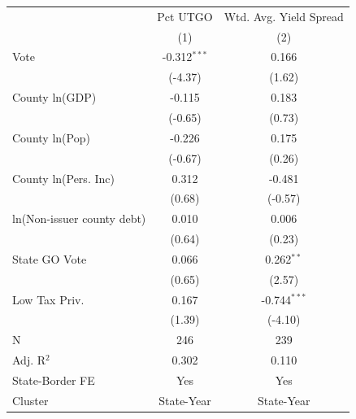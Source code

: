 \begingroup
\centering
\begin{tabular*}{\textwidth}{@{\extracolsep{\fill}}lcc}
   \toprule
                              & Pct UTGO       & Wtd. Avg. Yield Spread\\  
                              & (1)            & (2)\\  
   \midrule 
   Vote                       & -0.312$^{***}$ & 0.166\\   
                              & (-4.37)       & (1.62)\\   
   County ln(GDP)             & -0.115         & 0.183\\   
                              & (-0.65)       & (0.73)\\   
   County ln(Pop)             & -0.226         & 0.175\\   
                              & (-0.67)       & (0.26)\\   
   County ln(Pers. Inc)       & 0.312          & -0.481\\   
                              & (0.68)        & (-0.57)\\   
   ln(Non-issuer county debt) & 0.010          & 0.006\\   
                              & (0.64)        & (0.23)\\   
   State GO Vote              & 0.066          & 0.262$^{**}$\\   
                              & (0.65)        & (2.57)\\   
   Low Tax Priv.              & 0.167          & -0.744$^{***}$\\   
                              & (1.39)        & (-4.10)\\   
   \hline
   N               & 246            & 239\\  
   Adj. R$^2$             & 0.302          & 0.110\\  
   State-Border FE            & Yes            & Yes\\  
   Cluster              & State-Year & State-Year\\  
   \bottomrule
\end{tabular*}
\par\endgroup
